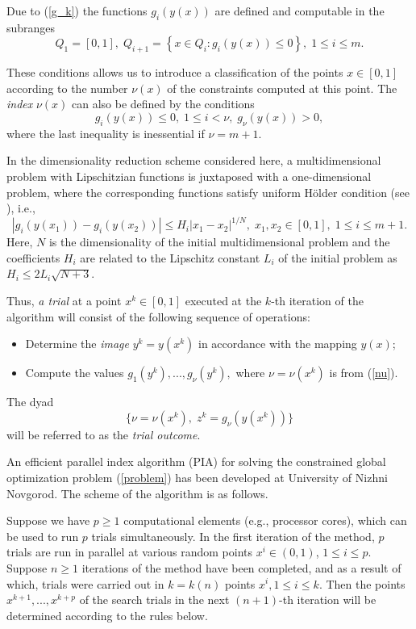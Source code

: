 \documentclass[runningheads]{llncs}
\begin{document}
Due to (\ref{g_k}) the functions $g_i(y(x))$ are defined
and computable in the subranges
\[
Q_1=[0,1], \; Q_{i+1}=\left\{x \in Q_i : g_i(y(x)) \leq 0 \right\}, \; 1 \leq i \leq m.
\]

These conditions allows us to introduce a classification of the points $x \in [0,1]$ according to
the number $\nu (x)$ of the constraints computed at this point. The \textit{index} $\nu(x)$ can
also be defined by the conditions
\begin{equation}\label{nu}
g_i(y(x)) \leq 0, \; 1 \leq i < \nu, \; g_\nu(y(x))>0,
\end{equation}
where the last inequality is inessential if $\nu=m+1$.

In the dimensionality reduction scheme considered here, a multidimensional problem with
Lipschitzian functions is juxtaposed with a one-dimensional problem, where the corresponding
functions satisfy uniform H{\"o}lder condition (see \cite{Strongin2013}), i.e.,
\[
\left|g_i(y(x_1))-g_i (y(x_2))\right| \leq H_i \left|x_1-x_2 \right|^{1/N}, \; x_1,x_2\in [0,1], \;
1\leq i \leq m+1.
\]
Here, $N$ is the dimensionality of the initial multidimensional problem and the coefficients
$H_i$ are related to the Lipschitz constant $L_i$ of the initial problem as $H_i \leq 2L_i
\sqrt{N+3}$.

Thus, \textit{a trial} at a point $x^k \in [0,1]$ executed at the $k$-th iteration of the algorithm
will consist of the following sequence of operations:
\begin{itemize}
	\item Determine the \textit{image} $y^k=y(x^k)$ in accordance with the mapping
$y(x)$;
	\item Compute the values $g_1(y^k),..., g_\nu(y^k),$ where $\nu = \nu(x^k)$ is from
(\ref{nu}).
\end{itemize}
The dyad
\begin{equation} \label{trial_result}
 \{ \nu=\nu(x^k), \; z^k=g_\nu(y(x^k)) \}
\end{equation}
will be referred to as the \textit{trial outcome}.

An efficient parallel index algorithm (PIA) for solving the constrained global optimization
problem (\ref{problem}) has been developed at University of Nizhni Novgorod. The scheme of
the algorithm is as follows.

Suppose we have $p \geq 1$  computational elements (e.g., processor cores), which can be
used to run $p$ trials simultaneously. In the first iteration of the method, $p$ trials are run in
parallel at various random points $x^i\in(0,1)$, $1\leq i \leq p$.
Suppose $n \geq 1$  iterations of the method have been completed, and as a result of which,
trials were carried out in $k=k(n)$ points $x^i, 1\leq i \leq k$. Then the points
$x^{k+1},...,x^{k+p}$  of the search trials in the next $(n+1)$-th iteration will be determined
according to the rules below.
\end{document}
